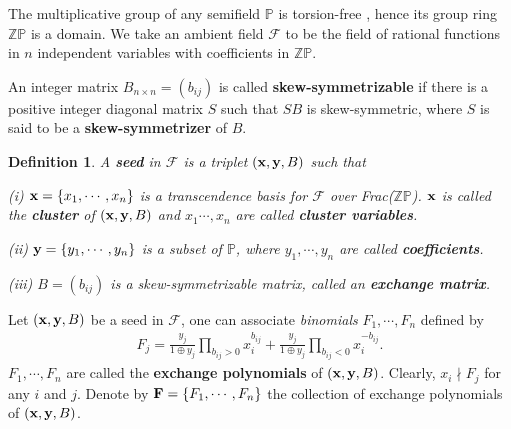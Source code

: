 \documentclass[14pt]{amsart}
\newtheorem{Definition}[Theorem]{Definition}
\begin{document}
The multiplicative group of any semifield $\mathbb P$ is torsion-free \cite{FZ}, hence its group ring $\mathbb Z\mathbb P$ is a domain.
We take an ambient field $\mathcal F$  to be the field of rational functions in $n$ independent variables with coefficients in $\mathbb Z\mathbb P$.


An integer matrix $B_{n\times n}=(b_{ij})$ is  called  {\bf skew-symmetrizable} if there is a positive integer diagonal matrix $S$ such that $SB$ is skew-symmetric, where $S$ is said to be a {\bf skew-symmetrizer} of $B$.








\begin{Definition}
A {\bf  seed} in $\mathcal F$ is a triplet $({\bf x},{\bf y},B)$ such that

(i)  ${\bf x}=\{x_1,\cdots, x_n\}$ is a transcendence basis for $\mathcal F$ over Frac($\mathbb {ZP}$). ${\bf x}$ is called the  {\bf cluster} of  $({\bf x},{\bf y},B)$ and $x_1\cdots,x_n$  are called {\bf cluster variables}.

(ii) ${\bf y}=\{y_1,\cdots,y_n\}$ is a subset of  $\mathbb P$, where $y_1,\cdots,y_n$ are called {\bf coefficients}.

(iii) $B=(b_{ij})$ is a skew-symmetrizable matrix, called an {\bf exchange matrix}.
\end{Definition}




Let $({\bf x},{\bf y}, B)$ be a  seed in $\mathcal F$, one can associate {\em binomials} $F_1,\cdots,F_n$ defined by
\begin{eqnarray}
F_j=\frac{y_j}{1\oplus y_j}\prod\limits_{b_{ij}>0}x_i^{b_{ij}}+\frac{y_j}{1\oplus y_j}\prod\limits_{b_{ij}<0}x_i^{-b_{ij}}.\nonumber
\end{eqnarray}
$F_1,\cdots,F_n$ are called the {\bf exchange polynomials} of $({\bf x},{\bf y}, B)$. Clearly, $x_i\nmid F_j$ for any $i$ and $j$. Denote by ${\bf F}=\{F_1,\cdots,F_n\}$ the collection of  exchange polynomials of $({\bf x},{\bf y}, B)$.
\end{document}
